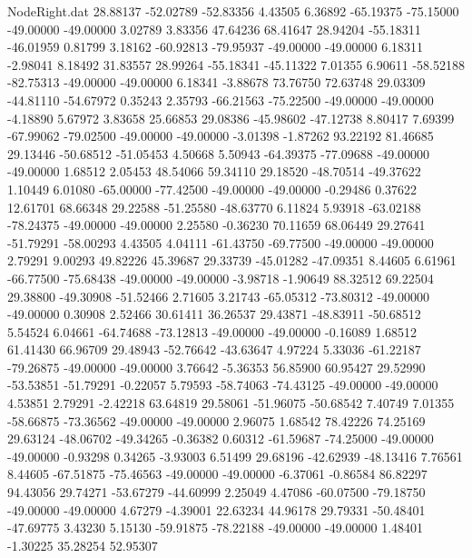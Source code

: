 \begin{filecontents}{NodeRight.dat}
  28.88137  -52.02789  -52.83356     4.43505    6.36892  -65.19375  -75.15000  -49.00000  -49.00000    3.02789    3.83356   47.64236   68.41647
  28.94204  -55.18311  -46.01959     0.81799    3.18162  -60.92813  -79.95937  -49.00000  -49.00000    6.18311   -2.98041    8.18492   31.83557
  28.99264  -55.18341  -45.11322     7.01355    6.90611  -58.52188  -82.75313  -49.00000  -49.00000    6.18341   -3.88678   73.76750   72.63748
  29.03309  -44.81110  -54.67972     0.35243    2.35793  -66.21563  -75.22500  -49.00000  -49.00000   -4.18890    5.67972    3.83658   25.66853
  29.08386  -45.98602  -47.12738     8.80417    7.69399  -67.99062  -79.02500  -49.00000  -49.00000   -3.01398   -1.87262   93.22192   81.46685
  29.13446  -50.68512  -51.05453     4.50668    5.50943  -64.39375  -77.09688  -49.00000  -49.00000    1.68512    2.05453   48.54066   59.34110
  29.18520  -48.70514  -49.37622     1.10449    6.01080  -65.00000  -77.42500  -49.00000  -49.00000   -0.29486    0.37622   12.61701   68.66348
  29.22588  -51.25580  -48.63770     6.11824    5.93918  -63.02188  -78.24375  -49.00000  -49.00000    2.25580   -0.36230   70.11659   68.06449
  29.27641  -51.79291  -58.00293     4.43505    4.04111  -61.43750  -69.77500  -49.00000  -49.00000    2.79291    9.00293   49.82226   45.39687
  29.33739  -45.01282  -47.09351     8.44605    6.61961  -66.77500  -75.68438  -49.00000  -49.00000   -3.98718   -1.90649   88.32512   69.22504
  29.38800  -49.30908  -51.52466     2.71605    3.21743  -65.05312  -73.80312  -49.00000  -49.00000    0.30908    2.52466   30.61411   36.26537
  29.43871  -48.83911  -50.68512     5.54524    6.04661  -64.74688  -73.12813  -49.00000  -49.00000   -0.16089    1.68512   61.41430   66.96709
  29.48943  -52.76642  -43.63647     4.97224    5.33036  -61.22187  -79.26875  -49.00000  -49.00000    3.76642   -5.36353   56.85900   60.95427
  29.52990  -53.53851  -51.79291    -0.22057    5.79593  -58.74063  -74.43125  -49.00000  -49.00000    4.53851    2.79291   -2.42218   63.64819
  29.58061  -51.96075  -50.68542     7.40749    7.01355  -58.66875  -73.36562  -49.00000  -49.00000    2.96075    1.68542   78.42226   74.25169
  29.63124  -48.06702  -49.34265    -0.36382    0.60312  -61.59687  -74.25000  -49.00000  -49.00000   -0.93298    0.34265   -3.93003    6.51499
  29.68196  -42.62939  -48.13416     7.76561    8.44605  -67.51875  -75.46563  -49.00000  -49.00000   -6.37061   -0.86584   86.82297   94.43056
  29.74271  -53.67279  -44.60999     2.25049    4.47086  -60.07500  -79.18750  -49.00000  -49.00000    4.67279   -4.39001   22.63234   44.96178
  29.79331  -50.48401  -47.69775     3.43230    5.15130  -59.91875  -78.22188  -49.00000  -49.00000    1.48401   -1.30225   35.28254   52.95307

\end{filecontents}
